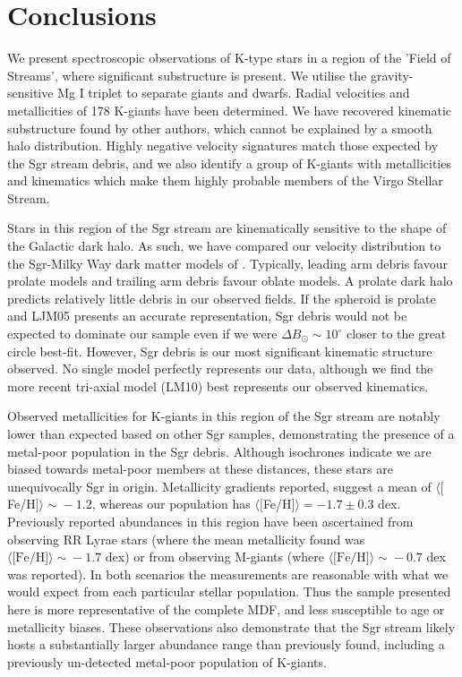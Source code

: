 \documentclass[preprint2]{aastex}
\begin{document}
	
\section{Conclusions}
\label{sec:conclusions}

	We present spectroscopic observations of K-type stars in a region of the 'Field of Streams', where significant substructure is present. We utilise the gravity-sensitive Mg I triplet to separate giants and dwarfs. Radial velocities and metallicities of 178 K-giants have been determined. We have recovered kinematic substructure found by other authors, which cannot be explained by a smooth halo distribution. Highly negative velocity signatures match those expected by the Sgr stream debris, and we also identify a group of K-giants with metallicities and kinematics which make them highly probable members of the Virgo Stellar Stream.

	Stars in this region of the Sgr stream are kinematically sensitive to the shape of the Galactic dark halo. As such, we have compared our velocity distribution to the Sgr-Milky Way dark matter models of \citet{Law;et-al_2005, Law;Majewski_2010}. Typically, leading arm debris favour prolate models and trailing arm debris favour oblate models. A prolate dark halo predicts relatively little debris in our observed fields. If the spheroid is prolate and LJM05 presents an accurate representation, Sgr debris would not be expected to dominate our sample even if we were $\Delta{}B_\odot\sim10^\circ$ closer to the great circle best-fit. However, Sgr debris is our most significant kinematic structure observed. No single model perfectly represents our data, although we find the more recent tri-axial model (LM10) best represents our observed kinematics. 
	
	Observed metallicities for K-giants in this region of the Sgr stream are notably lower than expected based on other Sgr samples, demonstrating the presence of a metal-poor population in the  Sgr debris. Although isochrones indicate we are biased towards metal-poor members at these distances, these stars are unequivocally Sgr in origin. Metallicity gradients reported, suggest a mean of $\langle[$Fe/H$]\rangle\sim{}-1.2$, whereas our population has $\langle[$Fe/H$]\rangle = -1.7 \pm 0.3$ dex. Previously reported abundances in this region have been ascertained from observing RR Lyrae stars (where the mean metallicity found was $\langle\mbox{[Fe/H]}\rangle\sim{}-1.7$ dex) or from observing M-giants (where $\langle\mbox{[Fe/H]}\rangle\sim{}-0.7$ dex was reported). In both scenarios the measurements are reasonable with what we would expect from each particular stellar population. Thus the sample presented here is more representative of the complete MDF, and less susceptible  to age or metallicity biases. These observations also demonstrate that the Sgr stream likely hosts a substantially larger abundance range than previously found, including a previously un-detected metal-poor population of K-giants.
\end{document}
